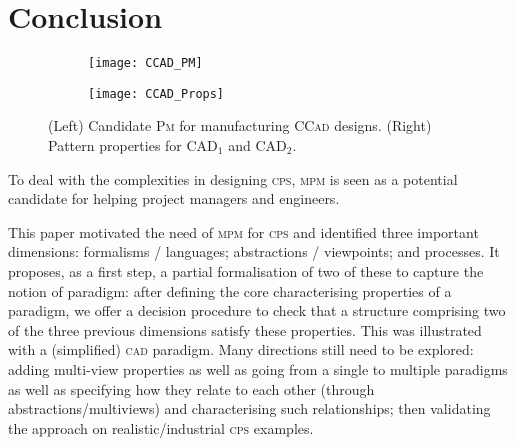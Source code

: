 \section{Conclusion}
\label{sec:Conclusion}


\begin{figure}[t]
\centering
\begin{subfigure}[t]{0.72\linewidth}
\centering
\texttt{[image: CCAD\_PM]}
\label{fig:CCAD-PM-Full}%
\end{subfigure}
\begin{subfigure}[t]{0.23\linewidth}
\centering
\texttt{[image: CCAD\_Props]}
\label{fig:PatternProperties}
\end{subfigure}
\vspace{-1em}
\caption{(Left) Candidate \textsc{Pm} for manufacturing \textsc{CCad} designs.
(Right) Pattern properties for $\mbox{CAD}_1$ and $\mbox{CAD}_2$.}

\vspace{-0.5cm}
\end{figure}

To deal with the complexities in designing \textsc{cps}, \textsc{mpm} 
is seen as a potential candidate for helping project managers and engineers. 

This paper motivated the need of \textsc{mpm} for \textsc{cps} and identified 
three important dimensions: formalisms / languages; 
abstractions / viewpoints; and processes. It proposes, as a first step, a 
partial formalisation of two of these to capture the notion of paradigm: after 
defining the core characterising properties of a paradigm, we offer a decision procedure 
to check that a structure comprising two of the three previous dimensions 
satisfy these properties. This was illustrated with a (simplified) \textsc{cad} 
paradigm. 
Many directions still need to be explored: adding multi-view properties as well as going from a single to multiple 
paradigms as well as specifying how they relate to each other (through 
abstractions/multiviews) and characterising such relationships; then validating 
the approach on realistic/industrial \textsc{cps} examples. 


